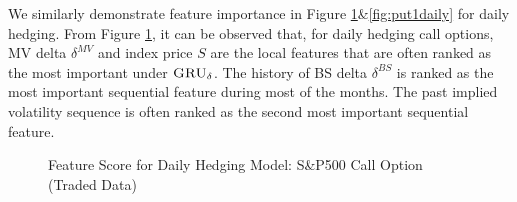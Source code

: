 \documentclass[letterpaper,12pt,titlepage,oneside,final]{book}
\numberwithin{equation}{section}
\theoremstyle{definition}
\newcommand{\model}{\textsc{GRU}_\delta}
\begin{document}
We similarly demonstrate feature importance in Figure \ref{fig:call1daily}\&\ref{fig:put1daily} for daily hedging.  From Figure \ref{fig:call1daily}, it can be observed that, for daily hedging call options, MV delta $\delta^{MV}$ and index price $S$ are the local features that are often ranked as the most important under $\model$. The history of BS delta $\delta^{BS}$ is ranked as the most important sequential feature during most of the months. The past implied volatility sequence is often ranked as the second most important sequential feature.
\begin{figure}[htp]
\centering
{}
\caption{Feature Score for Daily Hedging Model: S\&P500 Call Option (Traded Data)} \label{fig:call1daily}
\end{figure}
\end{document}
